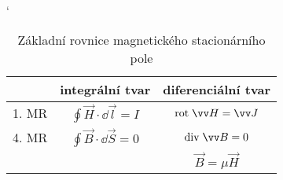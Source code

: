 \documentclass{scrbook}
\providecommand\DebugMode{true}
\begin{document}
% 
  \begin{table}[ht!]
    \catcode`
    \centering
    \begin{tabular}{lc|c|}
      \multicolumn{1}{l|}{} & \textbf{integrální tvar} & \textbf{diferenciální tvar} \\
      \hline
      \multicolumn{1}{|l|}{1. MR} & $\oint\vec{H}\cdot \dd{\vec{l}} = I$ & $\rot{H} = \vec{J}$ \\ 
      \hline
      \multicolumn{1}{|l|}{4. MR} & $\oint\vec{B}\cdot \dd{\vec{S}} = 0$ & $\diver{B} = 0$ \\
      & & $\vec{B} = \mu \vec{H}$ \\
      \cline{3-3}
    \end{tabular}
    \caption{Základní rovnice magnetického stacionárního pole}
  \end{table}

\end{document}
